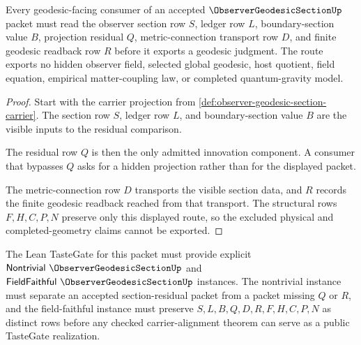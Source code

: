 \begin{theorem}
\label{thm:observer-geodesic-section-finite-readback}
Every geodesic-facing consumer of an accepted $\ObserverGeodesicSectionUp$ packet must read the observer section row $S$, ledger row $L$, boundary-section value $B$, projection residual $Q$, metric-connection transport row $D$, and finite geodesic readback row $R$ before it exports a geodesic judgment. The route exports no hidden observer field, selected global geodesic, host quotient, field equation, empirical matter-coupling law, or completed quantum-gravity model.
\end{theorem}
\begin{proof}
Start with the carrier projection from \autoref{def:observer-geodesic-section-carrier}. The section row $S$, ledger row $L$, and boundary-section value $B$ are the visible inputs to the residual comparison.

The residual row $Q$ is then the only admitted innovation component. A consumer that bypasses $Q$ asks for a hidden projection rather than for the displayed packet.

The metric-connection row $D$ transports the visible section data, and $R$ records the finite geodesic readback reached from that transport. The structural rows $F,H,C,P,N$ preserve only this displayed route, so the excluded physical and completed-geometry claims cannot be exported.
\end{proof}



The Lean TasteGate for this packet must provide explicit $\mathsf{Nontrivial}\ \ObserverGeodesicSectionUp$ and $\mathsf{FieldFaithful}\ \ObserverGeodesicSectionUp$ instances. The nontrivial instance must separate an accepted section-residual packet from a packet missing $Q$ or $R$, and the field-faithful instance must preserve $S,L,B,Q,D,R,F,H,C,P,N$ as distinct rows before any checked carrier-alignment theorem can serve as a public TasteGate realization.


